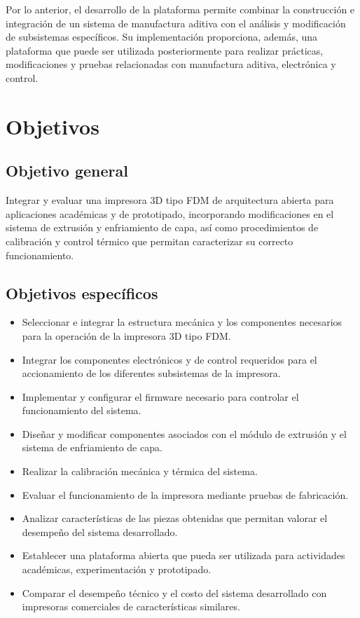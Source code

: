 Por lo anterior, el desarrollo de la plataforma permite combinar la construcción e integración de un sistema de manufactura aditiva con el análisis y modificación de subsistemas específicos. Su implementación proporciona, además, una plataforma que puede ser utilizada posteriormente para realizar prácticas, modificaciones y pruebas relacionadas con manufactura aditiva, electrónica y control.

\section{Objetivos}

\subsection{Objetivo general}
Integrar y evaluar una impresora 3D tipo FDM de arquitectura abierta para aplicaciones académicas y de prototipado, incorporando modificaciones en el sistema de extrusión y enfriamiento de capa, así como procedimientos de calibración y control térmico que permitan caracterizar su correcto funcionamiento.

\subsection{Objetivos específicos}
\begin{itemize}
  \item Seleccionar e integrar la estructura mecánica y los componentes necesarios para la operación de la impresora 3D tipo FDM.
  \item Integrar los componentes electrónicos y de control requeridos para el accionamiento de los diferentes subsistemas de la impresora.
  \item Implementar y configurar el firmware necesario para controlar el funcionamiento del sistema.
  \item Diseñar y modificar componentes asociados con el módulo de extrusión y el sistema de enfriamiento de capa.
  \item Realizar la calibración mecánica y térmica del sistema.
  \item Evaluar el funcionamiento de la impresora mediante pruebas de fabricación.
  \item Analizar características de las piezas obtenidas que permitan valorar el desempeño del sistema desarrollado.
  \item Establecer una plataforma abierta que pueda ser utilizada para actividades académicas, experimentación y prototipado.
 \item Comparar el desempeño técnico y el costo del sistema desarrollado con impresoras comerciales de características similares.
\end{itemize}

